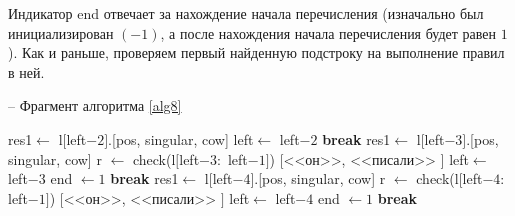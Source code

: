 \documentclass[main]{subfiles}
\begin{document}
Индикатор end отвечает за нахождение начала перечисления (изначально был инициализирован $(-1)$, а после нахождения начала перечисления будет равен $1$). Как и раньше, проверяем первый найденную подстроку на выполнение правил в ней.
\begin{algorithm}
	\caption{-- Фрагмент алгоритма \ref{alg8}}\label{alg9}
	\begin{algorithmic}[1]
	\State res1$\gets$ l$[$left$-2]$.[pos, singular, cow]
	\State left$\gets$ left$-2$
	\State \textbf{break}
	\EndIf
	\EndFor
	\EndIf
	\State res1$\gets$ l$[$left$-3]$.[pos, singular, cow]
	\State r $\gets$ check(l$[$left$-3:$ left$-1]$)
	\State \Return $[$<<он>>, <<писали>> $]$
	\State left$\gets$ left$-3$
	\State end $\gets 1$
	\State \textbf{break}
	\EndIf
	\EndIf
	\EndFor
	\EndIf
	\State res1$\gets$ l$[$left$-4]$.[pos, singular, cow]
	\State r $\gets$ check(l$[$left$-4:$ left$-1]$)
	\State \Return $[$<<он>>, <<писали>> $]$
	\State left$\gets$ left$-4$
	\State end $\gets 1$
	\State \textbf{break}
\EndIf
	\end{algorithmic}
\end{algorithm}
\end{document}

